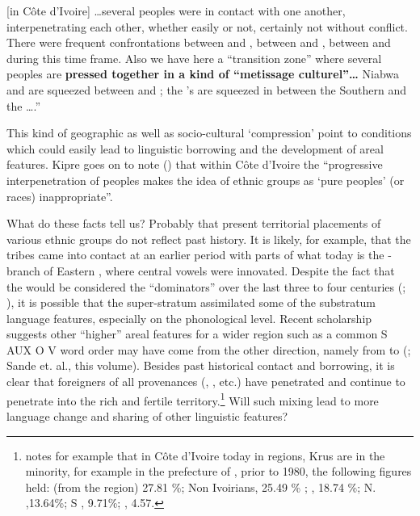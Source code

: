\documentclass[output=paper,newtxmath,modfonts,nonflat,draft]{langsci/langscibook}
\begin{document}
[in Côte d’Ivoire] …several peoples were in contact with one another, interpenetrating each other, whether easily or not, certainly not without conflict.  There were frequent confrontations between  and , between  and , between  and  during this time frame. Also we have here a “transition zone” where several peoples are \textbf{pressed together in a kind of “metissage culturel”…} Niabwa and  are squeezed between  and ; the ’s are squeezed in between the Southern  and the ….”


This kind of geographic as well as socio-cultural ‘compression’ point to conditions which could easily lead to linguistic borrowing and the development of areal features.  Kipre goes on to note (\citeyear[69]{kipre2005}) that within Côte d’Ivoire the “progressive interpenetration of peoples makes the idea of ethnic groups as ‘pure peoples’ (or races) inappropriate”.     


What do these facts tell us?  Probably that present territorial placements of various ethnic groups do not reflect past history. It is likely, for example, that the  tribes came into contact at an earlier period with parts of what today is the - branch of Eastern , where central vowels were innovated. Despite the fact that the  would be considered the “dominators” over the last three to four centuries (\citealt{Lafage1983}; \citealt[108]{Vydrine2009}), it is possible that the  super-stratum assimilated some of the substratum language features, especially on the phonological level.  Recent scholarship suggests other “higher” areal features for a wider region such as a common S AUX O V word order may have come from the other direction, namely from  to  (\citealt{guld08}; Sande et. al., this volume).  Besides past historical contact and borrowing, it is clear that foreigners of all provenances (, , etc.) have penetrated and continue to penetrate into the rich and fertile  territory.\footnote{\citet[54]{Lafage1983} notes for example that in Côte d’Ivoire today in  regions, Krus are in the minority, for example in the prefecture of , prior to 1980,  the following figures held:   (from the region) 27.81 \%; Non Ivoirians, 25.49 \% ; , 18.74 \%; N. ,13.64\%; S , 9.71\%; , 4.57.} Will such mixing lead to more language change and sharing of other linguistic features? 
\end{document}
